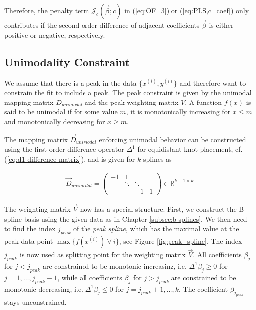 \documentclass[10pt,a4paper]{report}
\begin{document}
Therefore, the penalty term $\mathcal{J}_c(\vec{\beta}; c)$ in (\ref{eq:OF_3}) or (\ref{eq:PLS,c_coef}) only contributes if the second order difference of adjacent coefficients $\vec{\beta}$ is either positive or negative, respectively. \cite{eilers2005unimodal}

\subsection{Unimodality Constraint}

We assume that there is a peak in the data $\{x^{(i)}, y^{(i)}\}$ and therefore want to constrain the fit to include a peak. The peak constraint is given by the unimodal mapping matrix $D_{unimodal}$ and the peak weighting matrix $V$. A function $f(x)$ is said to be unimodal if for some value $m$, it is monotonically increasing for $x \le m$ and monotonically decreasing for $x \ge m$. 

The mapping matrix $\vec{D}_{unimodal}$ enforcing unimodal behavior can be constructed using the first order difference operator $\Delta^1$ for equidistant knot placement, cf. (\ref{eq:d1-difference-matrix}), and is given for $k$ splines as 

\begin{align}\label{eq:D_c_unimodal}
	\vec{D}_{unimodal} = \begin{pmatrix} -1 & 1 \\ 
		& \ddots & \ddots  \\
		& & -1 & 1
	\end{pmatrix} \in \mathbb{R}^{k-1 \times k}
\end{align}

The weighting matrix $\vec{V}$ now has a special structure. First, we construct the B-spline basis using the given data as in Chapter \ref{subsec:b-splines}. We then need to find the index $j_{peak}$ of the \emph{peak spline}, which has the maximal value at the peak data point $\max \{f(x^{(i)}) \ \forall \ i \}$, see Figure \ref{fig:peak_spline}. The index $j_{peak}$ is now used as splitting point for the weighting matrix $\vec{V}$. All coefficients $\beta_j$ for $j < j_{peak}$ are constrained to be monotonic increasing, i.e. $\Delta^1 \beta_j \ge 0$ for $j = 1, \dots, j_{peak}-1$, while all coefficients $\beta_j$ for $j > j_{peak}$ are constrained to be monotonic decreasing, i.e. $\Delta^1 \beta_j \le 0$ for $j = j_{peak}+1, \dots, k$. The coefficient $\beta_{j_{peak}}$ stays unconstrained. \cite{eilers2005unimodal} 
\end{document}
